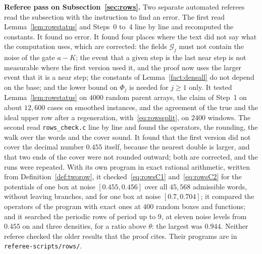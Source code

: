 \documentclass[11pt]{amsart}
\theoremstyle{definition}
\theoremstyle{remark}
\begin{document}
\medskip\noindent\textbf{Referee pass on Subsection~\ref{sec:rows}.} Two separate automated
referees read the subsection with the instruction to find an error. The first read
Lemma~\ref{lem:rowstatus} and Steps~0 to~4 line by line and recomputed the constants. It found no
error. It found four places where the text did not say what the computation uses, which are
corrected: the fields $\mathcal G_j$ must not contain the noise of the gate $a-K$; the event that
a given step is the last near step is not measurable where the first version used it, and the
proof now uses the larger event that it is a near step; the constants of
Lemma~\ref{fact:densall} do not depend on the base; and the lower bound on $\Phi_j$ is needed for
$j\ge1$ only. It tested Lemma~\ref{lem:rowstatus} on $4000$ random parent arrays, the claim of
Step~1 on about $12{,}600$ cases on smoothed instances, and the agreement of the true and the
ideal upper row after a regeneration, with~\eqref{eq:rowssplit}, on $2400$ windows. The second
read \texttt{rows\_check.c} line by line and found the operators, the rounding, the walk over the
words and the cover sound. It found that the first version did not cover the decimal number
$0.455$ itself, because the nearest double is larger, and that two ends of the cover were not
rounded outward; both are corrected, and the runs were repeated. With its own program in exact
rational arithmetic, written from Definition~\ref{def:tworow}, it checked~\eqref{eq:rowsC1}
and~\eqref{eq:rowsC2} for the potentials of one box at noise $[0.455,0.456]$ over all $45{,}568$
admissible words, without leaving branches, and for one box at noise $[0.7,0.704]$; it compared
the operators of the program with exact ones at $400$ random boxes and functions; and it
searched the periodic rows of period up to $9$, at eleven noise levels from $0.455$ on and three
densities, for a ratio above $\theta$: the largest was $0.944$. Neither referee checked the
older results that the proof cites. Their programs are in \texttt{referee-scripts/rows/}.
\end{document}
